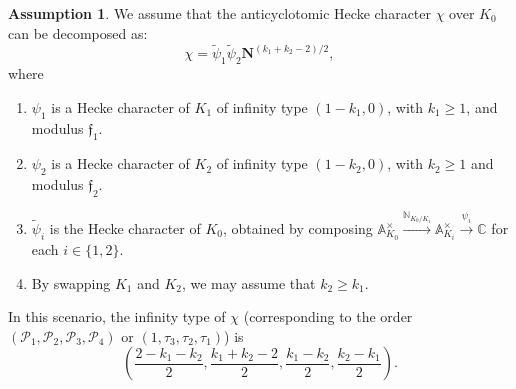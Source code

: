 \documentclass[10pt,letterpaper]{amsart}
\theoremstyle{plain}
\theoremstyle{definition}
\newtheorem{assumption}{Assumption}[section]
\theoremstyle{definition}
\theoremstyle{plain}
\theoremstyle{plain}
\theoremstyle{plain}
\theoremstyle{remark}
\numberwithin{equation}{section}
\newcommand{\fkf}{\mathfrak{f}}
\def\cP{{\mathcal P}}
\begin{document}
\begin{assumption}\label{eq:chi-decomp}
    We assume that the anticyclotomic Hecke character $\chi$ over $K_0$ can be decomposed as: 
    \begin{equation*}
\chi=\tilde{\psi}_1\tilde{\psi}_2\mathbf{N}^{(k_1+k_2-2)/2},
    \end{equation*}
    where
    \begin{enumerate}
     \item $\psi_1$ is a Hecke character of $K_1$ of infinity type $(1-k_1,0)$, with $k_1\geq 1$, and modulus  $\fkf_1$.
    \item  $\psi_2$ is a Hecke character of $K_2$ of infinity type $(1-k_2,0)$, with $k_2\geq 1$ and modulus  $\fkf_2$.
    \item $\tilde{\psi}_i$ is the Hecke character of $K_0$, obtained by composing $\mathbb{A}_{K_0}^{\times}\xrightarrow{\mathbb{N}_{K_0/K_i}}\mathbb{A}_{K_i}^{\times}\xrightarrow{\psi_i}\mathbb{C}$ for each $i\in\{1,2\}$.
    \item By swapping $K_1$ and $K_2$, we may assume that ${k_2\ge k_1}$.
    \end{enumerate}
In this scenario, the infinity type of $\chi$ (corresponding to the order $(\cP_1,\cP_2,\cP_3,\cP_4)$ or $(1,\tau_3,\tau_2,\tau_1)$) is
\[\left(\frac{2-k_1-k_2}{2},\frac{k_1+k_2-2}{2},\frac{k_1-k_2}{2},\frac{k_2-k_1}{2}\right).\] 
\end{assumption}

 
\end{document}
